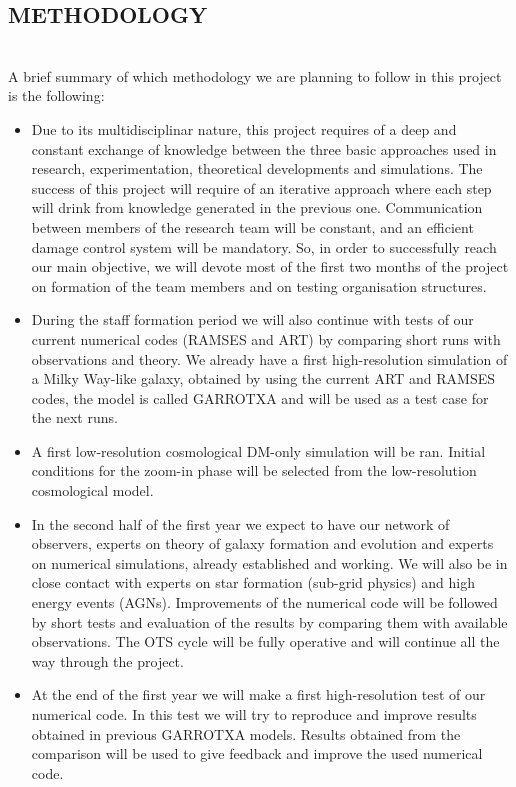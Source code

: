 \documentclass[oneside, a4paper, onecolumn, 11pt]{article}
\begin{document}
\subsection*{METHODOLOGY}\\
A brief summary of which methodology we are planning to follow in this project is the following:
\begin{itemize}
    \item Due to its multidisciplinar nature, this project requires of a deep and constant exchange of knowledge between the three basic approaches used in research, experimentation, theoretical developments and simulations. The success of this project will require of an iterative approach where each step will drink from knowledge generated in the previous one. Communication between members of the research team will be constant, and an efficient damage control system will be mandatory. So, in order to successfully reach our main objective, we will devote most of the first two months of the project on formation of the team members and on testing organisation structures.
    \item During the staff formation period we will also continue with tests of our current numerical codes (RAMSES and ART) by comparing short runs with observations and theory. We already have a first high-resolution simulation of a Milky Way-like galaxy, obtained by using the current ART and RAMSES codes, the model is called GARROTXA \citep{RocaFabrega16} and will be used as a test case for the next runs.
    \item A first low-resolution cosmological DM-only simulation will be ran. Initial conditions for the zoom-in phase will be selected from the low-resolution cosmological model. 
    \item In the second half of the first year we expect to have our network of observers, experts on theory of galaxy formation and evolution and experts on numerical simulations, already established and working. We will also be in close contact with experts on star formation (sub-grid physics) and high energy events (AGNs). Improvements of the numerical code will be followed by short tests and evaluation of the results by comparing them with available observations. The OTS cycle will be fully operative and will continue all the way through the project.
    \item At the end of the first year we will make a first high-resolution test of our numerical code. In this test we will try to reproduce and improve results obtained in previous GARROTXA models. Results obtained from the comparison will be used to give feedback and improve the used numerical code.

\end{itemize}
\end{document}
